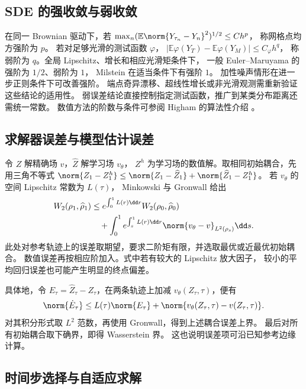 \subsection{SDE 的强收敛与弱收敛}

在同一 Brownian 驱动下，若
\(\max_n(\mathbb E\norm{Y_{\tau_n}-Y_n}^2)^{1/2}\le Ch^p\)，
称网格点均方强阶为 \(p\)。
若对足够光滑的测试函数 \(\varphi\)，
\(\left|\mathbb E\varphi(Y_T)-\mathbb E\varphi(Y_M)\right|\le C_\varphi h^q\)，
称弱阶为 \(q\)。全局 Lipschitz、增长和相应光滑矩条件下，
一般 Euler--Maruyama 的强阶为 \(1/2\)、弱阶为 \(1\)，
Milstein 在适当条件下有强阶 \(1\)。
加性噪声情形在进一步正则条件下可改善强阶。
端点奇异漂移、超线性增长或非光滑观测需重新验证这些结论的适用性。
弱误差结论直接控制指定测试函数，推广到某类分布距离还需统一常数。
数值方法的阶数与条件可参阅 Higham 的算法性介绍 \cite{higham2001sde}。

\subsection{求解器误差与模型估计误差}

令 \(Z\) 解精确场 \(v\)，\(\widehat Z\) 解学习场 \(v_\theta\)，
\(Z^h\) 为学习场的数值解。取相同初始耦合，先用三角不等式
\(\norm{Z_1-Z_1^h}\le\norm{Z_1-\widehat Z_1}+
\norm{\widehat Z_1-Z_1^h}\)。
若 \(v_\theta\) 的空间 Lipschitz 常数为 \(L(\tau)\)，
Minkowski 与 Gronwall 给出
\begin{equation}
 \begin{aligned}
 W_2(\rho_1,\widehat\rho_1)
 &\le e^{\int_0^1 L(r)\dd r}W_2(\rho_0,\widehat\rho_0)\\
 &\quad+\int_0^1 e^{\int_s^1L(r)\dd r}
       \norm{v_\theta-v}_{L^2(\rho_s)}\dd s.
 \end{aligned}
 \label{eq:generation-w2-stability}
\end{equation}
此处对参考轨迹上的误差取期望，要求二阶矩有限，并选取最优或近最优初始耦合。
数值误差再按相应阶加入。式中若有较大的 Lipschitz 放大因子，
较小的平均回归误差也可能产生明显的终点偏差。

具体地，令 \(E_\tau=\widehat Z_\tau-Z_\tau\)，在两条轨迹上加减
\(v_\theta(Z_\tau,\tau)\)，便有
\[
 \norm{\dot E_\tau}\le L(\tau)\norm{E_\tau}
       +\norm{v_\theta(Z_\tau,\tau)-v(Z_\tau,\tau)}.
\]
对其积分形式取 \(L^2\) 范数，再使用 Gronwall，得到上述耦合误差上界。
最后对所有初始耦合取下确界，即得 Wasserstein 界。
这也说明误差项可沿已知参考边缘计算。

\subsection{时间步选择与自适应求解}

